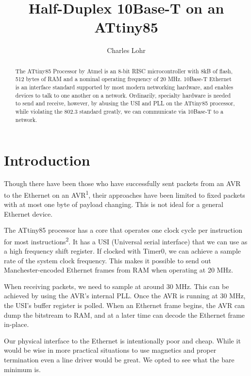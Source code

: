 \documentclass{article}
\begin{document}
\title{Half-Duplex 10Base-T on an ATtiny85}
\author{Charles Lohr}
\maketitle

\begin{abstract}
The ATtiny85 Processor by Atmel is an 8-bit RISC microcontroller with 8kB of 
flash, 512 bytes of RAM and a nominal operating frequency of 20 MHz.
10Base-T Ethernet is an interface standard supported by most modern networking
hardware, and enables devices to talk to one another on a network.  Ordinarily,
specialty hardware is needed to send and receive, however, by abusing
the USI and PLL on the ATtiny85 processor, while violating the 802.3 standard
greatly, we can communicate via 10Base-T to a network.
\end{abstract}

\section{Introduction}

Though there have been those who have successfully sent packets from an AVR to
the Ethernet on an AVR\textsuperscript{1}, their approaches have been limited
to fixed packets with at most one byte of payload changing.  This is not ideal
for a general Ethernet device.

The ATtiny85 processor has a core that operates one clock cycle per instruction
for most instructions\textsuperscript{2}.  It has a USI (Universal serial interface)
that we can use as a high frequency shift register.  If clocked with Timer0, 
we can achieve a sample rate of the system clock frequency.  This makes it possible
to send out Manchester-encoded Ethernet frames from RAM when operating at 20 MHz. 

When receiving packets, we need to sample at around 30 MHz.  This can be achieved
by using the AVR's internal PLL.  Once the AVR is running at 30 MHz, the USI's 
buffer register is polled.  When an Ethernet frame begins, the AVR can dump the 
bitstream to RAM, and at a later time can decode the Ethernet frame in-place.

Our physical interface to the Ethernet is intentionally poor and cheap.  While
it would be wise in more practical situations to use magnetics and proper termination
even a line driver would be great.  We opted to see what the bare minimum is.
\end{document}

